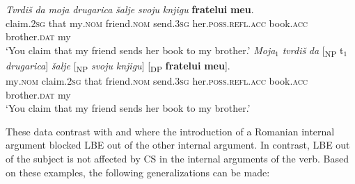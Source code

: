 \documentclass[output=paper,hidelinks,newtxmath,]{langscibook}
\begin{document}

\ea \label{15:ex30}
	\ea\label{15:ex30a}
    \gll \textit{Tvrdiš} \textit{da} \textit{moja} \textit{drugarica} \textit{šalje} \textit{svoju} \textit{knjigu} \textbf{fratelui} \textbf{meu}.\\          
         claim\textsc{.2sg} that my\textsc{.nom} friend\textsc{.nom} send\textsc{.3sg} her\textsc{.poss.refl.acc} book\textsc{.acc} brother\textsc{.dat} my\\
         \glt `You claim that my friend sends her book to my brother.'
	\ex\label{15:ex30b}
	 \gll \textit{Moja}$_1$ \textit{tvrdiš} \textit{da} [\textsubscript{NP} t$_1$ \textit{drugarica}] \textit{šalje}\hspace{3.5cm} [\textsubscript{NP} \textit{svoju} \textit{knjigu}] [\textsubscript{DP} \textbf{fratelui} \textbf{meu}].\\
         my\textsc{.nom} claim\textsc{.2sg} that {} {} friend\textsc{.nom} send\textsc{.3sg} {} her\textsc{.poss.refl.acc} book\textsc{.acc} {} brother\textsc{.dat} my\\ 
         \glt `You claim that my friend sends her book to my brother.'
	\z
\z

\noindent These data contrast with  and  where the introduction of a Romanian internal argument blocked LBE out of the other internal argument. In contrast, LBE out of the subject is not affected by CS in the internal arguments of the verb. Based on these examples, the following generalizations can be made:
\end{document}
